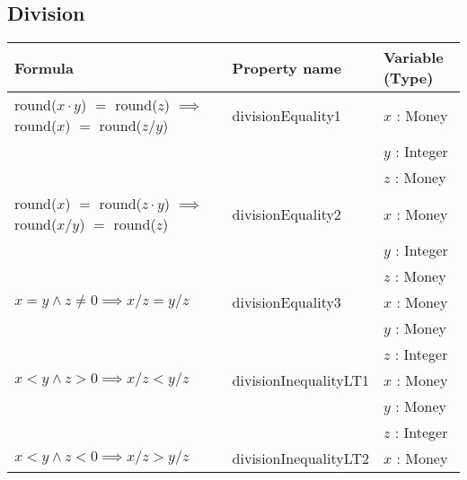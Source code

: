 \subsection*{Division}
\label{ssct:properties_division_updated}
\begin{table}[!ht]
\centering
\begin{tabular}{lll}
\hline
                        \textbf{Formula}                              & \textbf{Property name} & \textbf{Variable (Type)} \\ \hline
\rowcolor[HTML]{EFEFEF} round($x \cdot y$) $=$ round($z$) $\implies$
                                       round($x$) $=$ round($z / y$)  & divisionEquality1      & $x$ : Money              \\
\rowcolor[HTML]{EFEFEF}                                               &                        & $y$ : Integer            \\
\rowcolor[HTML]{EFEFEF}                                               &                        & $z$ : Money              \\
                        round($x$) $=$ round($z \cdot y$) $\implies$
												               round($x / y$) $=$ round($z$)  & divisionEquality2      & $x$ : Money              \\
                                                                      &                        & $y$ : Integer            \\
                                                                      &                        & $z$ : Money              \\
\rowcolor[HTML]{EFEFEF} $x = y \land z \neq 0 \implies x / z = y / z$ & divisionEquality3      & $x$ : Money              \\
\rowcolor[HTML]{EFEFEF}                                               &                        & $y$ : Money              \\
\rowcolor[HTML]{EFEFEF}                                               &                        & $z$ : Integer            \\
												$x < y \land z > 0 \implies x / z < y / z$    & divisionInequalityLT1  & $x$ : Money              \\
																																	    &                        & $y$ : Money              \\
																																	    &                        & $z$ : Integer            \\
\rowcolor[HTML]{EFEFEF} $x < y \land z < 0 \implies x / z > y / z$    & divisionInequalityLT2  & $x$ : Money              \\

\end{tabular}
\end{table}
